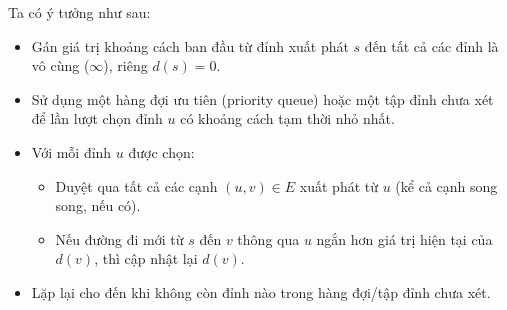 \documentclass{article}
\begin{document}
	Ta có ý tưởng như sau:
	
	\begin{itemize}
		\item Gán giá trị khoảng cách ban đầu từ đỉnh xuất phát $s$ đến tất cả các đỉnh là vô cùng ($\infty$), riêng $d(s) = 0$.
		
		\item Sử dụng một hàng đợi ưu tiên (priority queue) hoặc một tập đỉnh chưa xét để lần lượt chọn đỉnh $u$ có khoảng cách tạm thời nhỏ nhất.
		
		\item Với mỗi đỉnh $u$ được chọn:
		\begin{itemize}
			\item Duyệt qua tất cả các cạnh $(u, v) \in E$ xuất phát từ $u$ (kể cả cạnh song song, nếu có).
			\item Nếu đường đi mới từ $s$ đến $v$ thông qua $u$ ngắn hơn giá trị hiện tại của $d(v)$, thì cập nhật lại $d(v)$.
		\end{itemize}
		
		\item Lặp lại cho đến khi không còn đỉnh nào trong hàng đợi/tập đỉnh chưa xét.
	\end{itemize}
\end{document}
